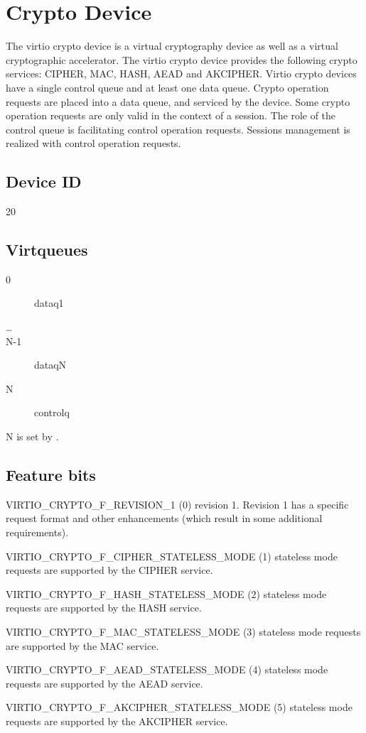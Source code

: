 \section{Crypto Device}\label{sec:Device Types / Crypto Device}

The virtio crypto device is a virtual cryptography device as well as a
virtual cryptographic accelerator. The virtio crypto device provides the
following crypto services: CIPHER, MAC, HASH, AEAD and AKCIPHER. Virtio crypto
devices have a single control queue and at least one data queue. Crypto
operation requests are placed into a data queue, and serviced by the
device. Some crypto operation requests are only valid in the context of a
session. The role of the control queue is facilitating control operation
requests. Sessions management is realized with control operation
requests.

\subsection{Device ID}\label{sec:Device Types / Crypto Device / Device ID}

20

\subsection{Virtqueues}\label{sec:Device Types / Crypto Device / Virtqueues}

\begin{description}
\item[0] dataq1
\item[\ldots]
\item[N-1] dataqN
\item[N] controlq
\end{description}

N is set by .

\subsection{Feature bits}\label{sec:Device Types / Crypto Device / Feature bits}

\begin{description}
\item VIRTIO_CRYPTO_F_REVISION_1 (0) revision 1. Revision 1 has a specific
    request format and other enhancements (which result in some additional
    requirements).
\item VIRTIO_CRYPTO_F_CIPHER_STATELESS_MODE (1) stateless mode requests are
    supported by the CIPHER service.
\item VIRTIO_CRYPTO_F_HASH_STATELESS_MODE (2) stateless mode requests are
    supported by the HASH service.
\item VIRTIO_CRYPTO_F_MAC_STATELESS_MODE (3) stateless mode requests are
    supported by the MAC service.
\item VIRTIO_CRYPTO_F_AEAD_STATELESS_MODE (4) stateless mode requests are
    supported by the AEAD service.
\item VIRTIO_CRYPTO_F_AKCIPHER_STATELESS_MODE (5) stateless mode requests are
    supported by the AKCIPHER service.
\end{description}


